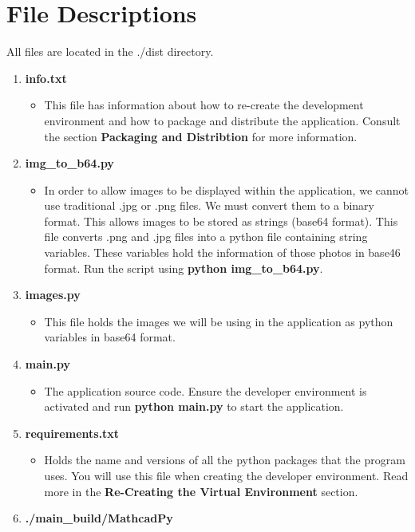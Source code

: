 \documentclass[11pt]{article}
\begin{document}
\section{File Descriptions}
\label{sec:org1e93595}
All files are located in the ./dist directory. 
\begin{enumerate}
\item \textbf{info.txt}
\begin{itemize}
\item This file has information about how to re-create the development environment and how to package and distribute the application. Consult the section \textbf{Packaging and Distribtion} for more information.
\end{itemize}
\item \textbf{img\_to\_b64.py}
\begin{itemize}
\item In order to allow images to be displayed within the application, we cannot use traditional .jpg or .png files. We must convert them to a binary format. This allows images to be stored as strings (base64 format). This file converts .png and .jpg files into a python file containing string variables. These variables hold the information of those photos in base46 format. Run the script using \textbf{python img\_to\_b64.py}.
\end{itemize}
\item \textbf{images.py}
\begin{itemize}
\item This file holds the images we will be using in the application as python variables in base64 format.
\end{itemize}
\item \textbf{main.py}
\begin{itemize}
\item The application source code. Ensure the developer environment is activated and run \textbf{python main.py} to start the application.
\end{itemize}
\item \textbf{requirements.txt}
\begin{itemize}
\item Holds the name and versions of all the python packages that the program uses. You will use this file when creating the developer environment. Read more in the \textbf{Re-Creating the Virtual Environment} section.
\end{itemize}
\item \textbf{./main\_build/MathcadPy}
\begin{itemize}

\end{itemize}
\end{enumerate}
\end{document}
